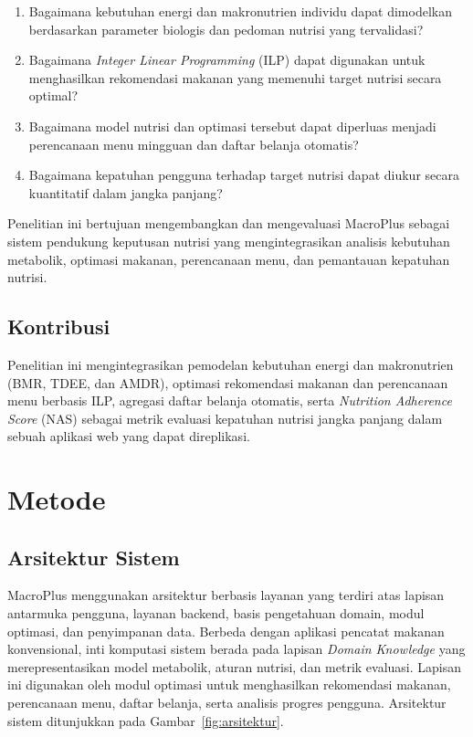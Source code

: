 \documentclass[conference]{IEEEtran}
\begin{document}
\begin{enumerate}
    \item Bagaimana kebutuhan energi dan makronutrien individu dapat
    dimodelkan berdasarkan parameter biologis dan pedoman nutrisi yang
    tervalidasi?

    \item Bagaimana \textit{Integer Linear Programming} (ILP) dapat
    digunakan untuk menghasilkan rekomendasi makanan yang memenuhi
    target nutrisi secara optimal?

    \item Bagaimana model nutrisi dan optimasi tersebut dapat diperluas
    menjadi perencanaan menu mingguan dan daftar belanja otomatis?

    \item Bagaimana kepatuhan pengguna terhadap target nutrisi dapat
    diukur secara kuantitatif dalam jangka panjang?
\end{enumerate}

Penelitian ini bertujuan mengembangkan dan mengevaluasi MacroPlus
sebagai sistem pendukung keputusan nutrisi yang mengintegrasikan
analisis kebutuhan metabolik, optimasi makanan, perencanaan menu,
dan pemantauan kepatuhan nutrisi.

\subsection{Kontribusi}

Penelitian ini mengintegrasikan pemodelan kebutuhan energi dan
makronutrien (BMR, TDEE, dan AMDR), optimasi rekomendasi makanan dan
perencanaan menu berbasis ILP, agregasi daftar belanja otomatis, serta
\textit{Nutrition Adherence Score} (NAS) sebagai metrik evaluasi
kepatuhan nutrisi jangka panjang dalam sebuah aplikasi web yang dapat
direplikasi.

\section{Metode}

\subsection{Arsitektur Sistem}
MacroPlus menggunakan arsitektur berbasis layanan yang terdiri atas
lapisan antarmuka pengguna, layanan backend, basis pengetahuan domain,
modul optimasi, dan penyimpanan data. Berbeda dengan aplikasi pencatat
makanan konvensional, inti komputasi sistem berada pada lapisan
\textit{Domain Knowledge} yang merepresentasikan model metabolik,
aturan nutrisi, dan metrik evaluasi. Lapisan ini digunakan oleh modul
optimasi untuk menghasilkan rekomendasi makanan, perencanaan menu,
daftar belanja, serta analisis progres pengguna. Arsitektur sistem
ditunjukkan pada Gambar~\ref{fig:arsitektur}.
\end{document}
